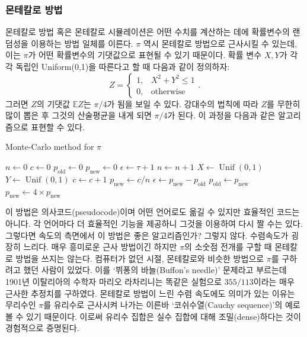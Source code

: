 \documentclass[10pt]{article}
\newcommand{\opn}{\operatorname}
\begin{document}
\subsubsection{몬테칼로 방법}
몬테칼로 방법 혹은 몬테칼로 시뮬레이션은 어떤 수치를 계산하는 데에 확률변수의 랜덤성을 이용하는 방법 일체를 이른다. $\pi$ 역시 몬테칼로 방법으로 근사시킬 수 있는데, 이는 $\pi$가 어떤 확률변수의 기댓값으로 표현될 수 있기 때문이다. 확률 변수 $X, Y$가 각각 독립인 Uniform(0,1)을 따른다고 할 때 다음과 같이 정의하자:
$$
  Z = \begin{cases}1, & X^{2} + Y^{2}\leq 1 \\0, & \text{otherwise} \end{cases}.
$$
그러면 $Z$의 기댓값 $\mathbb{E}Z$는 $\pi/4$가 됨을 보일 수 있다. 강대수의 법칙에 따라 $Z$를 무한히 많이 뽑은 후 그것의 산술평균을 내게 되면 $\pi/4$가 된다. 이 과정을 다음과 같은 알고리즘으로 표현할 수 있다.
\begin{algorithm}
  \caption{Monte-Carlo method for $\pi$}
  \begin{algorithmic}[1]
  \label{MCpi}
    \State $n \gets 0$
    \State $c \gets 0$
    \State $p_{\text{old}} \gets 0$
    \State $p_{\text{new}} \gets 0$
    \State $\epsilon \gets \tau + 1$
    \While{$\epsilon > \tau$}
      \State $n \gets n + 1$
      \State $X \gets \opn{Unif}\left(0,1\right)$
      \State $Y \gets \opn{Unif}\left(0,1\right)$
        \State $c \gets c + 1$
      \EndIf
      \State $p_{\text{new}} \gets c/n$
      \State $\epsilon \gets p_{\text{new}}-p_{\text{old}} $
      \State $p_{\text{old}} \gets p_{\text{new}}$
    \EndWhile
    \State $p_{\text{new}} \gets 4 \times p_{\text{new}}$
  \EndProcedure
  \end{algorithmic}
\end{algorithm}

이 방법은 의사코드(pseudocode)이며 어떤 언어로도 옮길 수 있지만 효율적인 코드는 아니다. 각 언어마다 더 효율적인 기능을 제공하니 그것을 이용하여 다시 짤 수는 있다. 그렇다면 속도의 측면에서 이 방법은 좋은 알고리즘인가? 그렇지 않다. 수렴속도가 굉장히 느리다. 매우 흥미로운 근사 방법이긴 하지만 $\pi$의 소숫점 전개를 구할 때 몬테칼로 방법을 쓰지는 않는다. 컴퓨터가 없던 시절, 몬테칼로와 비슷한 방법으로 $\pi$를 구하려고 했던 사람이 있었다. 이를 `뷔퐁의 바늘(Buffon's needle)' 문제라고 부르는데 1901년 이탈리아의 수학자 마리오 라차리니는 똑같은 실험으로 $355/113$이라는 매우 근사한 추정치를 구하였다. 몬테칼로 방법이 느린 수렴 속도에도 의미가 있는 이유는 무리수인 $\pi$를 유리수로 근사시켜 나가는 이른바 `코쉬수열(Cauchy sequence)'의 예로 볼 수 있기 때문이다. 이로써 유리수 집합은 실수 집합에 대해 조밀(dense)하다는 것이 경험적으로 증명된다.
\end{document}
